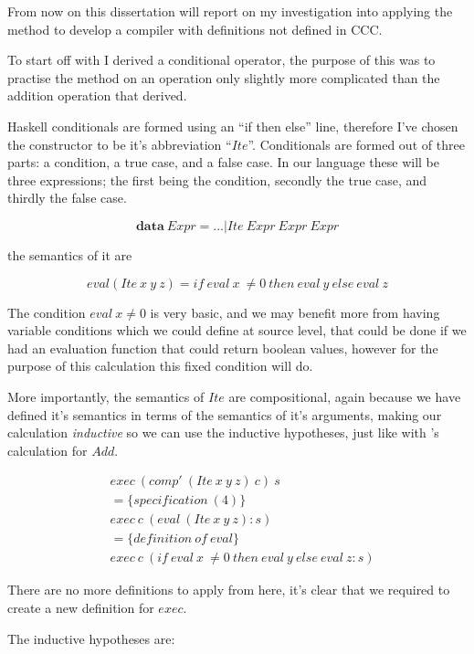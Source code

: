 \documentclass {article}
\begin{document}
From now on this dissertation will report on my
investigation into applying the \BH method to develop a compiler
with definitions not defined in CCC.

To start off with I derived a conditional operator,
the purpose of this was to practise the method
on an operation only slightly more complicated than
the addition operation that \BH derived.

\newcommand{\ite}{$Ite$}
\newcommand{\add}{$Add$}

Haskell conditionals are formed 
using an ``if then else'' line,
therefore I've chosen the constructor to be 
it's abbreviation ``\ite''.
Conditionals are formed out of three parts:
a condition, a true case, and a false case.
In our language these will be three expressions;
the first being the condition, secondly the true case,
and thirdly the false case.

	\[ \textbf{data} \ Expr = ... | Ite \ Expr \ Expr \ Expr \]

the semantics of it are

	\[eval(Ite \ x \ y \ z) = if \ eval \ x \ \not= 0 \ then \ eval \ y \ else \ eval \ z \]

The condition $eval \ x  \not= 0$ is very basic,
and we may benefit more from having variable conditions
which we could define at source level,
that could be done if we had an evaluation function 
that could return boolean values, 
however for the purpose of this calculation
this fixed condition will do.

More importantly, the semantics of \ite
are compositional, 
again because we have defined it's
semantics in terms of the semantics of 
it's arguments, 
making our calculation \emph{inductive}
so we can use the inductive hypotheses, 
just like with \BH's calculation for \add.

\begin{align*}
	&exec \ (comp' \ (Ite \ x \ y \ z) \ c) \ s \\
	&= \{specification \ (4) \} \\
	&exec \ c \ (eval \ (Ite \ x \ y \ z) : s) \\
	&= \{definition \ of \ eval\} \\
	&exec \ c \ (if \ eval \ x \ \not= 0 \ then \ eval \ y \ else \ eval \ z :s)
\end{align*}

There are no more definitions to apply from here,
it's clear that we required to
create a new definition for $exec$.

The inductive hypotheses are:
\end{document}
